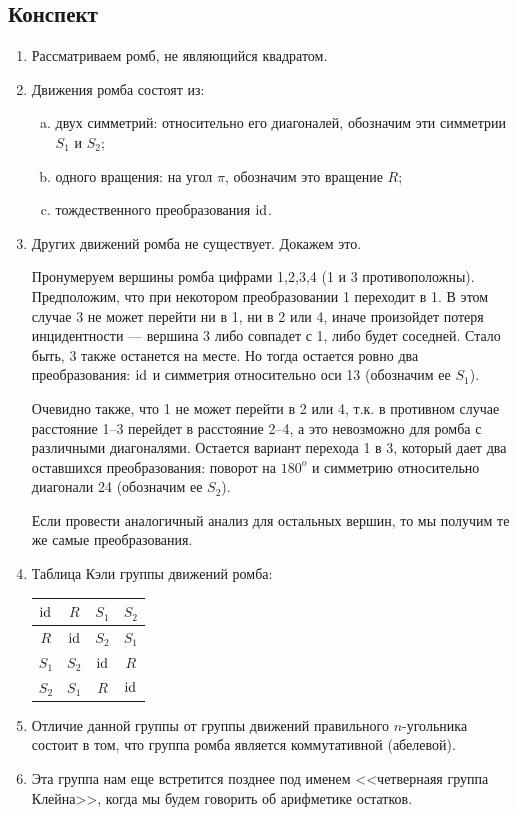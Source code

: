 \subsection{Конспект}
\begin{enumerate}\setlength{\itemsep}{1pt}
\item Рассматриваем ромб, не являющийся квадратом.
\item Движения ромба состоят из:
\begin{enumerate}[a)]
\item двух симметрий: относительно его диагоналей, обозначим эти симметрии $S_1$ и $S_2$;
\item одного вращения: на угол $\pi$, обозначим это вращение $R$;
\item тождественного преобразования $\mathrm{id}$.
\end{enumerate}
\item Других движений ромба не существует. Докажем это.

Пронумеруем вершины ромба цифрами 1,2,3,4 (1 и 3 противоположны). Предположим, что при некотором преобразовании 1 переходит в 1. В этом случае 3 не может перейти ни в 1, ни в 2 или 4, иначе произойдет потеря инцидентности --- вершина 3 либо совпадет с 1, либо будет соседней. Стало быть, 3 также останется на месте. Но тогда остается ровно два преобразования: $\mathrm{id}$ и симметрия относительно оси 13 (обозначим ее $S_1$).

Очевидно также, что 1 не может перейти в 2 или 4, т.к. в противном случае расстояние 1--3 перейдет в расстояние 2--4, а это невозможно для ромба с различными диагоналями. Остается вариант перехода 1 в 3, который дает два оставшихся преобразования: поворот на $180^o$ и симметрию относительно диагонали 24 (обозначим ее $S_2$).

Если провести аналогичный анализ для остальных вершин, то мы получим те же самые преобразования.
\item Таблица Кэли группы движений ромба:\hfill
\begin{tabular}{c|c|c|c|}
$\mathrm{id}$     & $R$ & $S_1$ & $S_2$ \\
\hline
$R$ & $\mathrm{id}$     & $S_2$ & $S_1$ \\
\hline
$S_1$     & $S_2$     & $\mathrm{id}$ & $R$ \\
\hline
$S_2$     & $S_1$     & $R$ & $\mathrm{id}$ \\
\hline
\end{tabular}

\item Отличие данной группы от группы движений правильного $n$-угольника состоит в том, что группа ромба является коммутативной (абелевой).
\item Эта группа нам еще встретится позднее под именем <<четвернаяя группа Клейна>>, когда мы будем говорить об арифметике остатков.
\end{enumerate}





